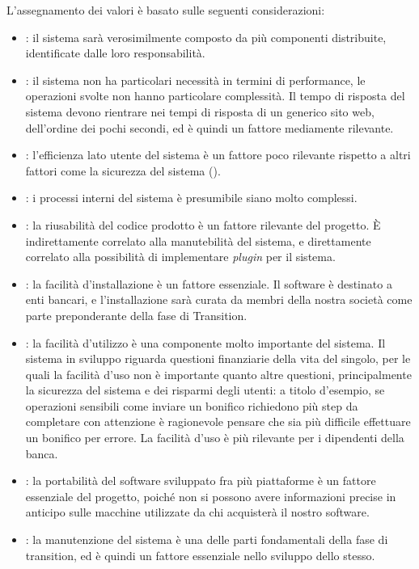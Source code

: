 L'assegnamento dei valori \`e basato sulle seguenti considerazioni:
\begin{itemize}
	\item {}: il sistema sar\`a verosimilmente composto da pi\`u componenti distribuite, identificate dalle loro responsabilit\`a.
	\item {}: il sistema non ha particolari necessit\`a in termini di performance, le operazioni svolte non hanno particolare complessit\`a.
		Il tempo di risposta del sistema devono rientrare nei tempi di risposta di un generico sito web, dell'ordine dei pochi secondi, ed \`e quindi un fattore mediamente rilevante.
	\item {}: l'efficienza lato utente del sistema \`e un fattore poco rilevante rispetto a altri fattori come la sicurezza del sistema ().
	\item {}: i processi interni del sistema \`e presumibile siano molto complessi.
	\item {}: la riusabilit\`a del codice prodotto \`e un fattore rilevante del progetto.
		\`E indirettamente correlato alla manutebilit\`a del sistema, e direttamente correlato alla possibilit\`a di implementare \emph{plugin} per il sistema.
	\item {}: la facilit\`a d'installazione \`e un fattore essenziale.
		Il software \`e destinato a enti bancari, e l'installazione sar\`a curata da membri della nostra societ\`a come parte preponderante della fase di Transition.
	\item {}: la facilit\`a d'utilizzo \`e una componente molto importante del sistema.
		Il sistema in sviluppo riguarda questioni finanziarie della vita del singolo, per le quali la facilit\`a d'uso non \`e importante quanto altre questioni, principalmente la sicurezza del sistema e dei risparmi degli utenti: a titolo d'esempio, se operazioni sensibili come inviare un bonifico richiedono pi\`u step da completare con attenzione \`e ragionevole pensare che sia pi\`u difficile effettuare un bonifico per errore.
		La facilit\`a d'uso \`e pi\`u rilevante per i dipendenti della banca.
	\item {}: la portabilit\`a del software sviluppato fra pi\`u piattaforme \`e un fattore essenziale del progetto, poich\'e non si possono avere informazioni precise in anticipo sulle macchine utilizzate da chi acquister\`a il nostro software.
	\item {}: la manutenzione del sistema \`e una delle parti fondamentali della fase di transition, ed \`e quindi un fattore essenziale nello sviluppo dello stesso.

\end{itemize}
